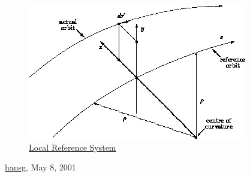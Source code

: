 \begin{figure}[h!]
  \centering
	\includegraphics{figures/local_reference.png}
  \caption{\href{local}{Local Reference System}}%
\end{figure}

\href{http://www.cern.ch/Hans.Grote/hansg_sign.html}{hansg}, May 8, 2001 








